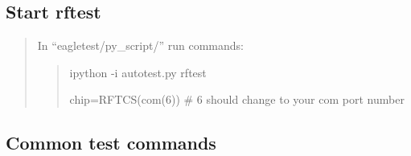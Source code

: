 \documentclass[letterpaper,10pt,english]{sphinxhowto}
\begin{document}
\subsection{Start rftest}
\label{\detokenize{quick_start/quick_start:start-rftest}}\begin{quote}

In “eagletest/py\_script/” run commands:
\begin{quote}

ipython -i autotest.py rftest

chip=RFTCS(com(6))   \# 6 should change to your com port number
\end{quote}
\end{quote}


\subsection{Common test commands}
\end{document}
